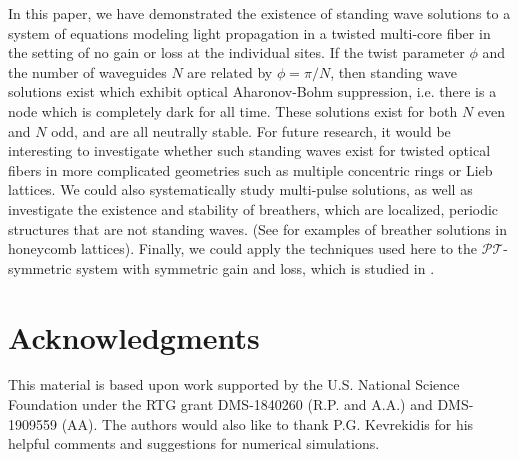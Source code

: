 \documentclass[12pt,reqno]{amsart}
\begin{document}
In this paper, we have demonstrated the existence of standing wave solutions to a system of equations modeling light propagation in a twisted multi-core fiber in the setting of no gain or loss at the individual sites. If the twist parameter $\phi$ and the number of waveguides $N$ are related by $\phi = \pi/N$, then standing wave solutions exist which exhibit optical Aharonov-Bohm suppression, i.e. there is a node which is completely dark for all time. These solutions exist for both $N$ even and $N$ odd, and are all neutrally stable. For future research, it would be interesting to investigate whether such standing waves exist for twisted optical fibers in more complicated geometries such as multiple concentric rings or Lieb lattices. We could also systematically study multi-pulse solutions, as well as investigate the existence and stability of breathers, which are localized, periodic structures that are not standing waves. (See \cite{Lumer2013} for examples of breather solutions in honeycomb lattices). Finally, we could apply the techniques used here to the $\mathcal{PT}$-symmetric system with symmetric gain and loss, which is studied in \cite{castro2016}.

\section*{Acknowledgments}

This material is based upon work supported by the U.S. National Science Foundation under the RTG grant DMS-1840260 (R.P. and A.A.) and DMS-1909559 (AA). The authors would also like to thank P.G. Kevrekidis for his helpful comments and suggestions for numerical simulations.



\end{document}
